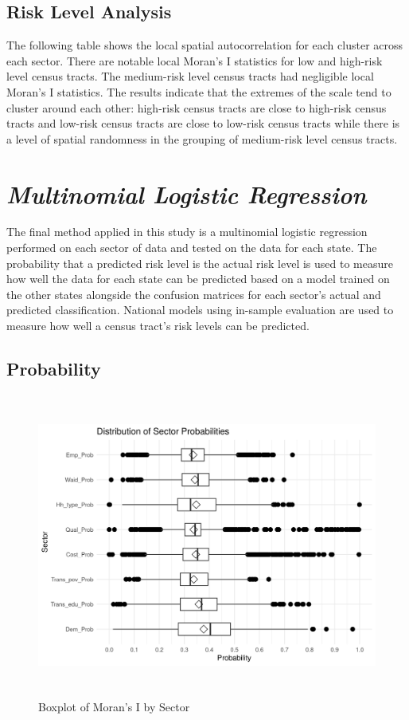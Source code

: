 \subsection{Risk Level Analysis}

The following table shows the local spatial autocorrelation for each cluster across each sector. There are notable local Moran's I statistics for low and high-risk level census tracts. The medium-risk level census tracts had negligible local Moran's I statistics. The results indicate that the extremes of the scale tend to cluster around each other: high-risk census tracts are close to high-risk census tracts and low-risk census tracts are close to low-risk census tracts while there is a level of spatial randomness in the grouping of medium-risk level census tracts. 



\section{\textit{Multinomial Logistic Regression}}

The final method applied in this study is a multinomial logistic regression performed on each sector of data and tested on the data for each state. The probability that a predicted risk level is the actual risk level is used to measure how well the data for each state can be predicted based on a model trained on the other states alongside the confusion matrices for each sector's actual and predicted classification. National models using in-sample evaluation are used to measure how well a census tract's risk levels can be predicted.

\subsection{Probability}

\begin{figure}[htbp]
    \centering
     \includegraphics[width=1\textwidth, height=10cm]{plots/prob_sector.png}
     \caption{Boxplot of Moran's I by Sector}
     \label{fig:prob_sector}
 \end{figure}

